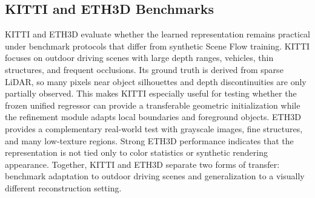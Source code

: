 \subsection{KITTI and ETH3D Benchmarks}
KITTI and ETH3D evaluate whether the learned representation remains practical under benchmark protocols that differ from synthetic Scene Flow training.
KITTI focuses on outdoor driving scenes with large depth ranges, vehicles, thin structures, and frequent occlusions.
Its ground truth is derived from sparse LiDAR, so many pixels near object silhouettes and depth discontinuities are only partially observed.
This makes KITTI especially useful for testing whether the frozen unified regressor can provide a transferable geometric initialization while the refinement module adapts local boundaries and foreground objects.
ETH3D provides a complementary real-world test with grayscale images, fine structures, and many low-texture regions.
Strong ETH3D performance indicates that the representation is not tied only to color statistics or synthetic rendering appearance.
Together, KITTI and ETH3D separate two forms of transfer: benchmark adaptation to outdoor driving scenes and generalization to a visually different reconstruction setting.

